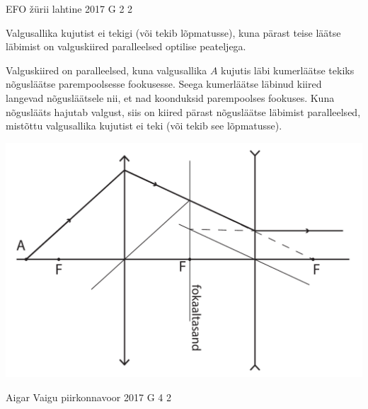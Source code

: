 \documentclass[11pt, twoside]{article}
\begin{document}
{{\fi
}

{EFO žürii} %
{lahtine} %
{2017} %
{G 2} %
{2} %
{

\ifSolution
Valgusallika kujutist ei tekigi (või tekib lõpmatusse), kuna pärast teise läätse läbimist on valguskiired paralleelsed optilise peateljega.

Valguskiired on paralleelsed, kuna valgusallika $A$ kujutis läbi kumerläätse tekiks nõgusläätse parempoolsesse fookusesse. Seega kumerläätse läbinud kiired langevad nõgusläätsele nii, et nad koonduksid parempoolses fookuses. Kuna nõguslääts hajutab valgust, siis on kiired pärast nõgusläätse läbimist paralleelsed, mistõttu valgusallika kujutist ei teki (või tekib see lõpmatusse).

\begin{center}
	\includegraphics[width=0.7\linewidth]{2017-lahg-02-valgusallikaslah}
\end{center}
\fi
}

{Aigar Vaigu} %
{piirkonnavoor} %
{2017} %
{G 4} %
{2} %
{

}}
\end{document}

